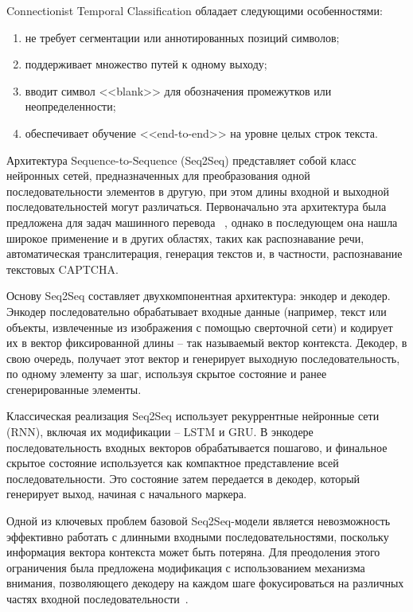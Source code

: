 Connectionist Temporal Classification обладает следующими особенностями:

\begin{enumerate}
    \item не требует сегментации или аннотированных позиций символов;
    \item поддерживает множество путей к одному выходу;
    \item вводит символ <<blank>> для обозначения промежутков или 
    неопределенности;
    \item обеспечивает обучение <<end-to-end>> на уровне целых строк текста.
\end{enumerate}

Архитектура Sequence-to-Sequence (Seq2Seq) представляет собой класс нейронных 
сетей, предназначенных для преобразования одной последовательности элементов в 
другую, при этом длины входной и выходной последовательностей могут различаться. 
Первоначально эта архитектура была предложена для задач машинного перевода
~\cite{seq2seq}, однако в последующем она нашла широкое применение и в других 
областях, таких как распознавание речи, автоматическая транслитерация, генерация 
текстов и, в частности, распознавание текстовых CAPTCHA.

Основу Seq2Seq составляет двухкомпонентная архитектура: энкодер и декодер. 
Энкодер последовательно обрабатывает входные данные (например, текст или объекты, 
извлеченные из изображения с помощью сверточной сети) и кодирует их в вектор 
фиксированной длины -- так называемый вектор контекста. Декодер, в свою очередь, 
получает этот вектор и генерирует выходную последовательность, по одному элементу 
за шаг, используя скрытое состояние и ранее сгенерированные элементы.

Классическая реализация Seq2Seq использует рекуррентные нейронные сети (RNN), 
включая их модификации -- LSTM и GRU. В энкодере последовательность входных 
векторов обрабатывается пошагово, и финальное скрытое состояние используется как 
компактное представление всей последовательности. Это состояние затем передается 
в декодер, который генерирует выход, начиная с начального маркера.

Одной из ключевых проблем базовой Seq2Seq-модели является невозможность 
эффективно работать с длинными входными последовательностями, поскольку 
информация вектора контекста может быть потеряна. Для преодоления этого 
ограничения была предложена модификация с использованием механизма внимания, 
позволяющего декодеру на каждом шаге фокусироваться на различных частях входной 
последовательности~\cite{seq2seqattention}.

